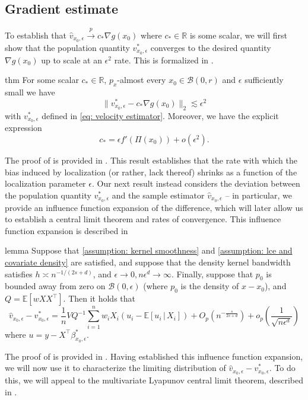 \documentclass[11pt]{article}
\begin{document}
\subsection{Gradient estimate} \label{sec: velocity results presentation}

To establish that $\hat{v}_{x_0, \epsilon} \overset{p}{\rightarrow} c_*\nabla g(x_0)$ where $c_* \in \mathbb{R}$ is some scalar, we will first show that the population quantity $v^*_{x_0, \epsilon}$ converges to the desired quantity $\nabla g(x_0)$ up to scale at an $\epsilon^2$ rate. This is formalized in .

\begin{restatable}{thm}{}\label{thm: population prop}
    For some scalar $c_* \in \mathbb{R}$, $p_x$-almost every $x_0 \in \mathcal{B}(0, r)$ and $\epsilon$ sufficiently small we have 
    \[\|v^*_{x_0, \epsilon} - c_*\nabla g(x_0)\|_2 \lesssim \epsilon^2\]
    with $v^*_{x_0, \epsilon}$ defined in \cref{eq: velocity estimator}. Moreover, we have the explicit expression
    \[c_* = \epsilon f'(\Pi(x_0))+ o(\epsilon^2).\]
\end{restatable}

The proof of  is provided in . This result establishes that the rate with which the bias induced by localization (or rather, lack thereof) shrinks as a function of the localization parameter $\epsilon$. Our next result instead considers the deviation between the population quantity $v^*_{x_0, \epsilon}$ and the sample estimator $\hat v_{x_0, \epsilon}$ -- in particular, we provide an influence function expansion of the difference, which will later allow us to establish a central limit theorem and rates of convergence. This influence function expansion is described in 

\begin{restatable}{lemma}{} \label{thm: decomposition for beta}
    Suppose that \cref{assumption: kernel smoothness} and \cref{assumption: lce and covariate density} are satisfied, and suppose that the density kernel bandwidth satisfies $h \asymp n^{-1/(2s+d)}$, and $\epsilon \rightarrow 0, n\epsilon^d \rightarrow \infty$. Finally, suppose that $p_0$ is bounded away from zero on $\mathcal{B}(0, \epsilon)$ (where $p_0$ is the density of $x - x_0$), and $Q = \mathbb{E}[wXX^{\top}]$. Then it holds that
    \[\hat{v}_{x_0, \epsilon} - v^*_{x_0, \epsilon} = \frac{1}{n}VQ^{-1}\sum_{i = 1}^nw_iX_i(u_i - \mathbb{E}[u_i\,|\,X_i]) + O_p\left(n^{-\frac{s}{2s+d}}\right) +o_p\left(\frac{1}{\sqrt{n\epsilon^{d}}}\right)\]
    where $u = y - X^{\top}\beta_{x_0, \epsilon}^*$.
\end{restatable}
The proof of  is provided in . Having established this influence function expansion, we will now use it to characterize the limiting distribution of $\hat{v}_{x_0, \epsilon} - v^*_{x_0, \epsilon}.$ To do this, we will appeal to the multivariate Lyapunov central limit theorem, described in .
\end{document}
